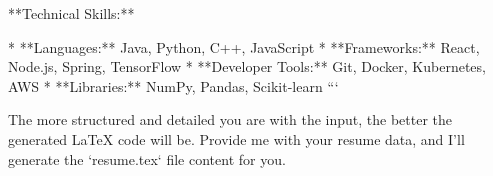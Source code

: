 **Technical Skills:**

*   **Languages:** Java, Python, C++, JavaScript
*   **Frameworks:** React, Node.js, Spring, TensorFlow
*   **Developer Tools:** Git, Docker, Kubernetes, AWS
*   **Libraries:** NumPy, Pandas, Scikit-learn
```

The more structured and detailed you are with the input, the better the generated LaTeX code will be. Provide me with your resume data, and I'll generate the `resume.tex` file content for you.